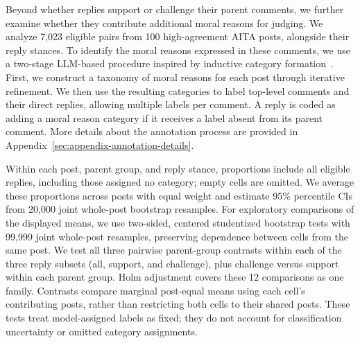 Beyond whether replies support or challenge their parent comments, we further examine whether they contribute additional moral reasons for judging.
We analyze 7,023 eligible pairs from 100 high-agreement AITA posts, alongside their reply stances.
To identify the moral reasons expressed in these comments, we use a two-stage LLM-based procedure inspired by inductive category formation~\citep{mayring2014qualitative}.
First, we construct a taxonomy of moral reasons for each post through iterative refinement.
We then use the resulting categories to label top-level comments and their direct replies, allowing multiple labels per comment.
A reply is coded as adding a moral reason category if it receives a label absent from its parent comment.
More details about the annotation process are provided in Appendix~\ref{sec:appendix-annotation-details}.

Within each post, parent group, and reply stance, proportions include all eligible replies, including those assigned no
category; empty cells are omitted. We average these proportions across
posts with equal weight and estimate $95\%$ percentile CIs from 20,000
joint whole-post bootstrap resamples.
For exploratory comparisons of the displayed means, we use two-sided,
centered studentized bootstrap tests with 99,999 joint whole-post
resamples, preserving dependence between cells from the same post.
We test all three pairwise parent-group contrasts within each of the
three reply subsets (all, support, and challenge), plus challenge versus
support within each parent group. Holm adjustment covers these 12
comparisons as one family. Contrasts compare marginal post-equal means
using each cell's contributing posts, rather than restricting both cells
to their shared posts. These tests treat model-assigned labels as fixed;
they do not account for classification uncertainty or omitted category
assignments.
